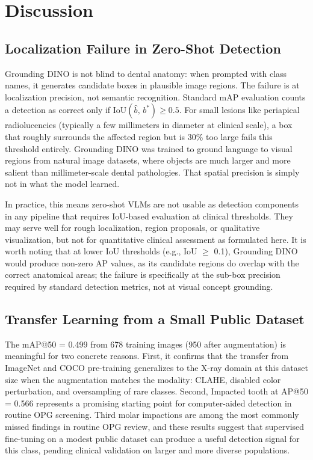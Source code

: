 \documentclass[conference]{IEEEtran}
\begin{document}
\section{Discussion}

\subsection{Localization Failure in Zero-Shot Detection}

Grounding DINO is not blind to dental anatomy: when prompted with class names, it generates candidate boxes in plausible image regions. The failure is at localization precision, not semantic recognition. Standard mAP evaluation counts a detection as correct only if $\text{IoU}(\hat{b},\, b^{*}) \geq 0.5$. For small lesions like periapical radiolucencies (typically a few millimeters in diameter at clinical scale), a box that roughly surrounds the affected region but is 30\% too large fails this threshold entirely. Grounding DINO was trained to ground language to visual regions from natural image datasets, where objects are much larger and more salient than millimeter-scale dental pathologies. That spatial precision is simply not in what the model learned.

In practice, this means zero-shot VLMs are not usable as detection components in any pipeline that requires IoU-based evaluation at clinical thresholds. They may serve well for rough localization, region proposals, or qualitative visualization, but not for quantitative clinical assessment as formulated here. It is worth noting that at lower IoU thresholds (e.g., IoU $\geq$ 0.1), Grounding DINO would produce non-zero AP values, as its candidate regions do overlap with the correct anatomical areas; the failure is specifically at the sub-box precision required by standard detection metrics, not at visual concept grounding.

\subsection{Transfer Learning from a Small Public Dataset}

The mAP@50 = 0.499 from 678 training images (950 after augmentation) is meaningful for two concrete reasons. First, it confirms that the transfer from ImageNet and COCO pre-training generalizes to the X-ray domain at this dataset size when the augmentation matches the modality: CLAHE, disabled color perturbation, and oversampling of rare classes. Second, Impacted tooth at AP@50 = 0.566 represents a promising starting point for computer-aided detection in routine OPG screening. Third molar impactions are among the most commonly missed findings in routine OPG review, and these results suggest that supervised fine-tuning on a modest public dataset can produce a useful detection signal for this class, pending clinical validation on larger and more diverse populations.
\end{document}
